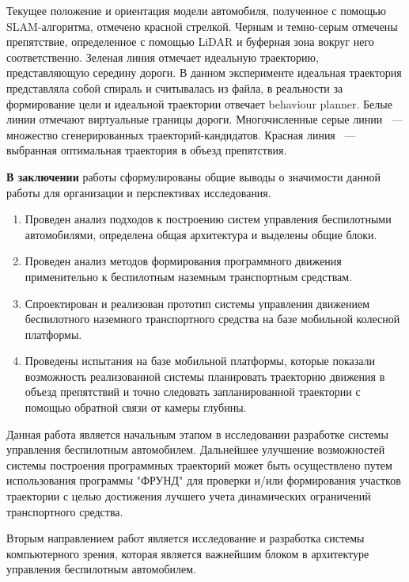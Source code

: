 Текущее положение и ориентация модели автомобиля, полученное с помощью SLAM-алгоритма, отмечено
красной стрелкой. Черным и темно-серым отмечены препятствие, определенное с помощью LiDAR и буферная
зона вокруг него соответственно. Зеленая линия отмечает идеальную траекторию, представляющую
середину дороги. В данном эксперименте идеальная траектория представляла собой спираль и считывалась
из файла, в реальности за формирование цели и идеальной траектории отвечает behaviour planner.
Белые линии отмечают виртуальные границы дороги. Многочисленные серые линии ~--- множество
сгенерированных траекторий-кандидатов. Красная линия ~--- выбранная оптимальная траектория
в объезд препятствия.



\textbf{В заключении} работы сформулированы общие выводы о значимости данной работы для
организации и перспективах исследования.

\begin{enumerate}
    \item Проведен анализ подходов к построению систем управления беспилотными
          автомобилями, определена общая архитектура и выделены общие блоки.
    \item Проведен анализ методов формирования программного движения применительно к беспилотным наземным транспортным
          средствам.
    \item Спроектирован и реализован прототип системы управления движением беспилотного
          наземного транспортного средства на базе мобильной колесной платформы.
    \item Проведены испытания на базе мобильной платформы, которые показали возможность
          реализованной системы планировать траекторию движения в объезд препятствий и
          точно следовать запланированной траектории с помощью обратной связи от камеры глубины.

\end{enumerate}

Данная работа является начальным этапом в исследовании разработке системы управления
беспилотным автомобилем.
Дальнейшее улучшение возможностей системы построения программных траекторий может быть осуществлено путем использования
программы "ФРУНД" для проверки и/или формирования участков траектории с целью достижения лучшего учета динамических
ограничений транспортного средства.

Вторым направлением работ является исследование и разработка системы компьютерного зрения,
которая является важнейшим блоком в архитектуре управления беспилотным автомобилем.

